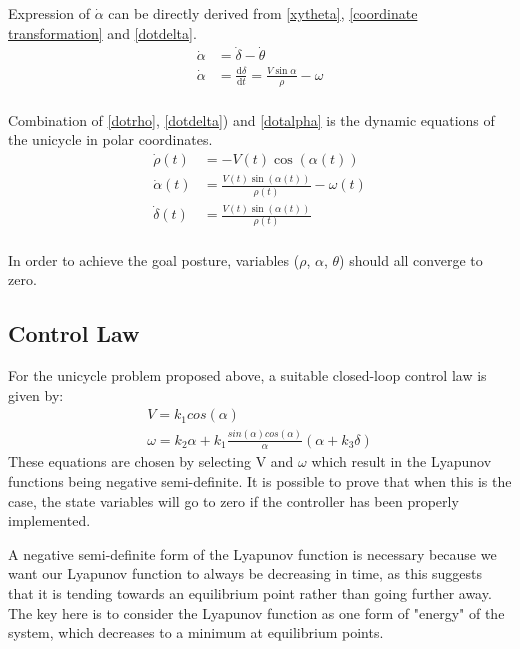 \documentclass[twoside]{article}
\begin{document}
Expression of $\dot{\alpha}$ can be directly derived from \eqref{xytheta}, \eqref{coordinate transformation} and \eqref{dotdelta}.
\begin{equation} \label{dotalpha}
\begin{split}
\dot{\alpha} &= \dot{\delta} - \dot{\theta} \\
\dot{\alpha} &=  \frac{\mathrm{d}\delta}{\mathrm{d}t}=\frac{V \sin\alpha}{\rho} - \omega \\
\end{split}
\end{equation}

Combination of \eqref{dotrho}, \eqref{dotdelta}) and \eqref{dotalpha} is the dynamic equations of the unicycle in polar coordinates.
\begin{equation} \label{dotRhoDeltaAlpha}
\begin{split}
\dot{\rho}(t) &= -V(t) \cos(\alpha(t)) \\
\dot{\alpha}(t) &= \frac{V(t) \sin(\alpha(t))}{\rho(t)} - \omega(t) \\
\dot{\delta}(t) &= \frac{V(t) \sin(\alpha(t))}{\rho(t)}  \\
\end{split}
\end{equation}

In order to achieve the goal posture, variables ($\rho$, $\alpha$, $\theta$) should all converge to zero.

\pagebreak
\subsection{Control Law}

For the unicycle problem proposed above, a suitable closed-loop control law is given by:
\begin{equation}
\begin{split}
V=k_1 cos(\alpha)
\\
\omega=k_2 \alpha + k_1 \frac{sin(\alpha)cos(\alpha)}{\alpha}(\alpha + k_3 \delta)
\end{split}
\end{equation}
These equations are chosen by selecting V and $\omega$ which result in the Lyapunov functions being negative semi-definite. It is possible to prove that when this is the case, the state variables will go to zero if the controller has been properly implemented.

A negative semi-definite form of the Lyapunov function is necessary because we want our Lyapunov function to always be decreasing in time, as this suggests that it is tending towards an equilibrium point rather than going further away. The key here is to consider the Lyapunov function as one form of "energy" of the system, which decreases to a minimum at equilibrium points.
\end{document}
